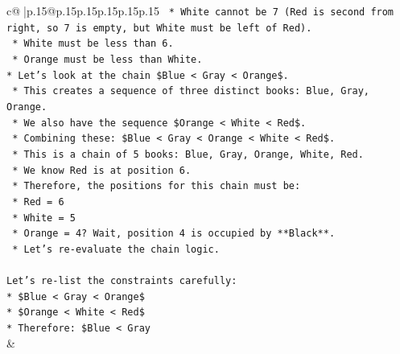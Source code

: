 \documentclass{article}
\begin{document}
{\begin{supertabular}{c@{$\;$}|p{.15\linewidth}@{}p{.15\linewidth}p{.15\linewidth}p{.15\linewidth}p{.15\linewidth}p{.15\linewidth}}
{{{\texttt{    *   White cannot be 7 (Red is second from right, so 7 is empty, but White must be left of Red).} \\
\texttt{    *   White must be less than 6.} \\
\texttt{    *   Orange must be less than White.} \\
\texttt{*   Let's look at the chain \$Blue < Gray < Orange\$.} \\
\texttt{    *   This creates a sequence of three distinct books: Blue, Gray, Orange.} \\
\texttt{    *   We also have the sequence \$Orange < White < Red\$.} \\
\texttt{    *   Combining these: \$Blue < Gray < Orange < White < Red\$.} \\
\texttt{    *   This is a chain of 5 books: Blue, Gray, Orange, White, Red.} \\
\texttt{    *   We know Red is at position 6.} \\
\texttt{    *   Therefore, the positions for this chain must be:} \\
\texttt{        *   Red = 6} \\
\texttt{        *   White = 5} \\
\texttt{        *   Orange = 4? Wait, position 4 is occupied by **Black**.} \\
\texttt{        *   Let's re{-}evaluate the chain logic.} \\
\\ 
\texttt{Let's re{-}list the constraints carefully:} \\
\texttt{*   \$Blue < Gray < Orange\$} \\
\texttt{*   \$Orange < White < Red\$} \\
\texttt{*   Therefore: \$Blue < Gray} \\
            }
        }
    }
    & \\ \\


\end{supertabular}}
\end{document}
